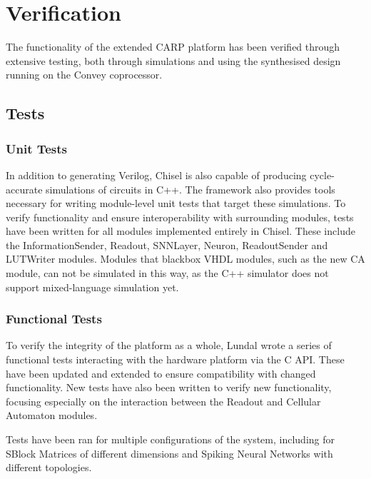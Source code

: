 
\chapter{Verification}
\label{chp:verification}

The functionality of the extended CARP platform has been verified through
extensive testing, both through simulations and using the synthesised design
running on the Convey coprocessor.

\section{Tests}
\label{sec:test}

\subsection{Unit Tests}
\label{sec:unit-tests}

In addition to generating Verilog, Chisel is also capable of producing
cycle-accurate simulations of circuits in C++. The framework also provides tools
necessary for writing module-level unit tests that target these simulations. To
verify functionality and ensure interoperability with surrounding modules, tests
have been written for all modules implemented entirely in Chisel. These include
the InformationSender, Readout, SNNLayer, Neuron, ReadoutSender and LUTWriter
modules. Modules that blackbox VHDL modules, such as the new CA module, can not
be simulated in this way, as the C++ simulator does not support mixed-language
simulation yet.

\subsection{Functional Tests}
\label{sec:functional-test}

To verify the integrity of the platform as a whole, Lundal wrote a series of
functional tests interacting with the hardware platform via the C API. These
have been updated and extended to ensure compatibility with changed
functionality. New tests have also been written to verify new functionality,
focusing especially on the interaction between the Readout and Cellular Automaton
modules.

Tests have been ran for multiple configurations of the system, including
for SBlock Matrices of different dimensions and Spiking Neural Networks with
different topologies.

